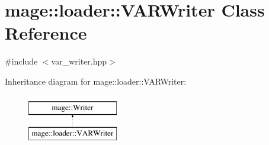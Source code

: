 \hypertarget{classmage_1_1loader_1_1_v_a_r_writer}{}\section{mage\+:\+:loader\+:\+:V\+A\+R\+Writer Class Reference}
\label{classmage_1_1loader_1_1_v_a_r_writer}


{\ttfamily \#include $<$var\+\_\+writer.\+hpp$>$}

Inheritance diagram for mage\+:\+:loader\+:\+:V\+A\+R\+Writer\+:\begin{figure}[H]
\begin{center}
\leavevmode
\includegraphics[height=2.000000cm]{classmage_1_1loader_1_1_v_a_r_writer}
\end{center}
\end{figure}
